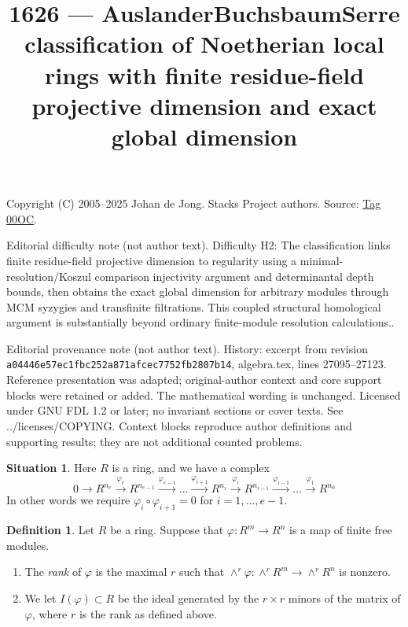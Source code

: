\documentclass{amsart}
\theoremstyle{plain}
\theoremstyle{definition}
\newtheorem{definition}[subsection]{Definition}
\newtheorem{situation}[subsection]{Situation}
\theoremstyle{remark}
\numberwithin{equation}{subsection}
\begin{document}
\title[Stacks Project, Tag 00OC]{1626 --- Auslander\textendash{}Buchsbaum\textendash{}Serre classification of Noetherian local rings with finite residue-field projective dimension and exact global dimension}
\maketitle
\noindent Copyright (C) 2005--2025 Johan de Jong. Stacks Project authors. Source: \href{https://stacks.math.columbia.edu/tag/00OC}{Tag 00OC}.

\noindent Editorial difficulty note (not author text). Difficulty H2: The classification links finite residue-field projective dimension to regularity using a minimal-resolution/Koszul comparison injectivity argument and determinantal depth bounds, then obtains the exact global dimension for arbitrary modules through MCM syzygies and transfinite filtrations. This coupled structural homological argument is substantially beyond ordinary finite-module resolution calculations..

\noindent Editorial provenance note (not author text). History: excerpt from revision \texttt{a0444\allowbreak 6e57e\allowbreak c1fbc\allowbreak 252a8\allowbreak 71afc\allowbreak ec775\allowbreak 2fb28\allowbreak 07b14}, algebra.tex, lines 27095--27123. Reference presentation was adapted; original-author context and core support blocks were retained or added. The mathematical wording is unchanged. Licensed under GNU FDL 1.2 or later; no invariant sections or cover texts. See ../licenses/COPYING. Context blocks reproduce author definitions and supporting results; they are not additional counted problems.

\begin{situation}
\label{situation-complex}
Here $R$ is a ring, and we have a complex
$$
0
\to
R^{n_e}
\xrightarrow{\varphi_e}
R^{n_{e-1}}
\xrightarrow{\varphi_{e-1}}
\ldots
\xrightarrow{\varphi_{i + 1}}
R^{n_i}
\xrightarrow{\varphi_i}
R^{n_{i-1}}
\xrightarrow{\varphi_{i-1}}
\ldots
\xrightarrow{\varphi_1}
R^{n_0}
$$
In other words we require $\varphi_i \circ \varphi_{i + 1} = 0$
for $i = 1, \ldots, e - 1$.
\end{situation}

\begin{definition}
\label{definition-rank}
Let $R$ be a ring. Suppose that $\varphi : R^m \to R^n$ is a map
of finite free modules.
\begin{enumerate}
\item The {\it rank} of $\varphi$ is the maximal $r$ such that
$\wedge^r \varphi : \wedge^r R^m \to \wedge^r R^n$ is nonzero.
\item We let $I(\varphi) \subset R$ be the ideal generated by
the $r \times r$ minors of the matrix of $\varphi$, where $r$
is the rank as defined above.
\end{enumerate}
\end{definition}
\end{document}
